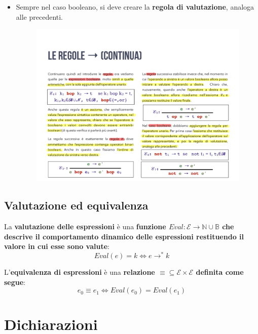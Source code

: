 \documentclass[a4paper]{article}
\begin{document}
\begin{itemize}
		\item Sempre nel caso booleano, si deve creare la \textbf{regola di valutazione}, analoga alle precedenti.
		\begin{figure}[!htp]
			\centering
			\includegraphics[width=.65\textwidth]{img/regola_transizione-7.pdf}
		\end{figure}
	\end{itemize}\newpage
	
	\subsection{Valutazione ed equivalenza}
	
	\begin{boxdef}
		La \textcolor{Red3}{\textbf{valutazione delle espressioni}} è una \textbf{funzione $Eval: \mathcal{E} \rightarrow \mathbb{N} \cup \mathbb{B}$ che descrive il comportamento dinamico delle espressioni restituendo il valore in cui esse sono valute}:
		\begin{equation*}
			Eval\left(e\right) = k \iff e \rightarrow^* k
		\end{equation*}
	\end{boxdef}\:\newline

	\begin{boxdef}
		L'\textcolor{Red3}{\textbf{equivalenza di espressioni}} è una \textbf{relazione $\equiv \subseteq \mathcal{E} \times \mathcal{E}$ definita come segue}:
		\begin{equation*}
			e_{0} \equiv e_{1} \iff Eval\left(e_{0}\right) = Eval\left(e_{1}\right)
		\end{equation*}
	\end{boxdef}\newpage

	\section{Dichiarazioni}
	
\end{document}
